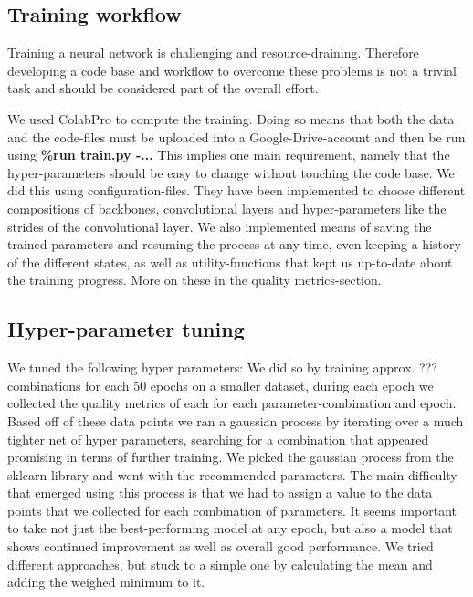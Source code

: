 \subsection{Training workflow}

Training a neural network is challenging and resource-draining. Therefore developing a code base and workflow to overcome these problems is not a trivial task and should be considered part of the overall effort. 

We used ColabPro to compute the training. Doing so means that both the data and the code-files must be uploaded into a Google-Drive-account and then be run using
\newline \textbf{\%run train.py -...} 
\newline This implies one main requirement, namely that the hyper-parameters should be easy to change without touching the code base. We did this using configuration-files. They have been implemented to choose different compositions of backbones, convolutional layers and hyper-parameters like the strides of the convolutional layer. We also implemented means of saving the trained parameters and resuming the process at any time, even keeping a history of the different states, as well as utility-functions that kept us up-to-date about the training progress. More on these in the quality metrics-section. 

\subsection{Hyper-parameter tuning}
We tuned the following hyper parameters: 
We did so by training approx. ??? combinations for each 50 epochs on a smaller dataset, during each epoch we collected the quality metrics of each for each parameter-combination and epoch. Based off of these data points we ran a gaussian process by iterating over a much tighter net of hyper parameters, searching for a combination that appeared promising in terms of further training. We picked the gaussian process from the sklearn-library and went with the recommended parameters.
The main difficulty that emerged using this process is that we had to assign a value to the data points that we collected for each combination of parameters. It seems important to take not just the best-performing model at any epoch, but also a model that shows continued improvement as well as overall good performance. We tried different approaches, but stuck to a simple one by calculating the mean and adding the weighed minimum to it. 


